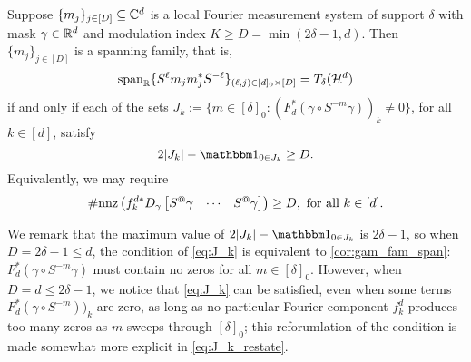 \begin{proposition}
  Suppose $\{m_j\}_{j \in [D]} \subseteq \mathbb{C}^d$ is a local Fourier measurement system of support $\delta$ with mask $\gamma \in \mathbb{R}^d$ and modulation index $K \ge D = \min (2 \delta - 1, d)$.  Then $\{m_j\}_{j \in [D]}$ is a spanning family, that is, \[\operatorname{span}_{\mathbb{R}}\{S^{\ell} m_j m_j^* S^{-\ell}\}_{(\ell, j) \in [d]_0 \times [D]} = T_\delta(\mathcal{H}^d)\] if and only if each of the sets $J_k := \{m \in [\delta]_0 : (F_d^* (\gamma \circ S^{-m} \gamma))_k \neq 0\}$, for all $k \in [d]$, satisfy \begin{equation} %
    2 \abs{J_k} - \one_{0 \in J_k} \ge D
    .\label{eq:J_k}\end{equation}  Equivalently, we may require \begin{equation} \#\mathrm{nnz}\left(f_k^{d*} D_\gamma \rowmatfun{S^@ \gamma}{1 - \delta}{\delta - 1}\right) \ge D, \ \text{for all} \ k \in [d].\label{eq:J_k_restate}\end{equation}
  \label{prop:span_fam} \label{prop:gam_span_herm}
\end{proposition}

We remark that the maximum value of $2 \abs{J_k} - \one_{0 \in J_k}$ is $2 \delta - 1$, so when $D = 2 \delta - 1 \le d$, the condition of \eqref{eq:J_k} is equivalent to \cref{cor:gam_fam_span}: $F_d^* (\gamma \circ S^{-m} \gamma)$ must contain no zeros for all $m \in [\delta]_0$.  However, when $D = d \le 2 \delta - 1$, we notice that \eqref{eq:J_k} can be satisfied, even when some terms $F_d^* (\gamma \circ S^{-m}))_k$ are zero, as long as no particular Fourier component $f_k^d$ produces too many zeros as $m$ sweeps through $[\delta]_0$; this reforumlation of the condition is made somewhat more explicit in \eqref{eq:J_k_restate}.
